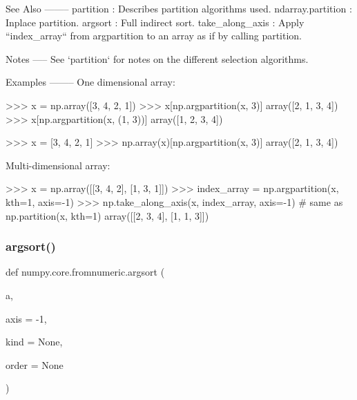 \begin{DoxyVerb}
See Also
--------
partition : Describes partition algorithms used.
ndarray.partition : Inplace partition.
argsort : Full indirect sort.
take_along_axis : Apply ``index_array`` from argpartition
                  to an array as if by calling partition.

Notes
-----
See `partition` for notes on the different selection algorithms.

Examples
--------
One dimensional array:

>>> x = np.array([3, 4, 2, 1])
>>> x[np.argpartition(x, 3)]
array([2, 1, 3, 4])
>>> x[np.argpartition(x, (1, 3))]
array([1, 2, 3, 4])

>>> x = [3, 4, 2, 1]
>>> np.array(x)[np.argpartition(x, 3)]
array([2, 1, 3, 4])

Multi-dimensional array:

>>> x = np.array([[3, 4, 2], [1, 3, 1]])
>>> index_array = np.argpartition(x, kth=1, axis=-1)
>>> np.take_along_axis(x, index_array, axis=-1)  # same as np.partition(x, kth=1)
array([[2, 3, 4],
       [1, 1, 3]])\end{DoxyVerb}
 \mbox{\label{namespacenumpy_1_1core_1_1fromnumeric_afdffddb3e74b9b677f131e8896024fce}} 
\subsubsection{\texorpdfstring{argsort()}{argsort()}}
{\footnotesize\ttfamily def numpy.\+core.\+fromnumeric.\+argsort (\begin{DoxyParamCaption}\item[{}]{a,  }\item[{}]{axis = {\ttfamily -\/1},  }\item[{}]{kind = {\ttfamily None},  }\item[{}]{order = {\ttfamily None} }\end{DoxyParamCaption})}

